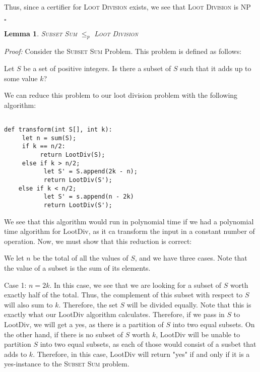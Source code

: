 \documentclass{article}
\newtheorem{lemma}[theorem]{Lemma}
\begin{document}
Thus, since a certifier for \textsc{Loot Division} exists, we see that \textsc{Loot Division} is NP

\begin{flushright}
$\square$
\end{flushright} 


\begin{lemma}
\textsc{Subset Sum} $\leq_p$ \textsc{Loot Division}
\end{lemma}

\textit{Proof:} Consider the \textsc{Subset Sum} Problem.  This problem is defined as follows:

Let $S$ be a set of positive integers.  Is there a subset of $S$ such that it adds up to some value $k$?

We can reduce this problem to our loot division problem with the following algorithm:

\begin{verbatim}

def transform(int S[], int k):
     let n = sum(S);
     if k == n/2:
          return LootDiv(S);
     else if k > n/2;
           let S' = S.append(2k - n);
           return LootDiv(S');
    else if k < n/2;
           let S' = s.append(n - 2k)
           return LootDiv(S');

\end{verbatim}


We see that this algorithm would run in polynomial time if we had a polynomial time algorithm for LootDiv, as it ca transform the input in a constant number of operation.  Now, we must show that this reduction is correct:

We let $n$ be the total of all the values of $S$, and we have three cases.  Note that the value of a subset is the sum of its elements.

Case 1: $n = 2k$.  In this case, we see that we are looking for a subset of $S$ worth exactly half of the total.  Thus, the complement of this subset with respect to $S$ will also sum to $k$.  Therefore, the set $S$ will be divided equally.  Note that this is exactly what our LootDiv algorithm calculates.  Therefore, if we pass in $S$ to LootDiv, we will get a yes, as there is a partition of $S$ into two equal subsets.  On the other hand, if there is no subset of $S$ worth $k$, LootDiv will be unable to partition $S$ into two equal subsets, as each of those would consist of a susbet that adds to $k$.  Therefore, in this case, LootDiv will return "yes" if and only if it is a yes-instance to the \textsc{Subset Sum} problem.
\end{document}

